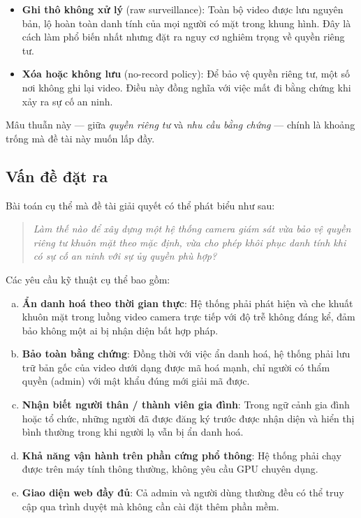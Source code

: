\begin{itemize}
    \item \textbf{Ghi thô không xử lý} (raw surveillance): Toàn bộ video được lưu nguyên bản, lộ hoàn toàn danh tính của mọi người có mặt trong khung hình. Đây là cách làm phổ biến nhất nhưng đặt ra nguy cơ nghiêm trọng về quyền riêng tư.
    \item \textbf{Xóa hoặc không lưu} (no-record policy): Để bảo vệ quyền riêng tư, một số nơi không ghi lại video. Điều này đồng nghĩa với việc mất đi bằng chứng khi xảy ra sự cố an ninh.
\end{itemize}

\medskip
Mâu thuẫn này --- giữa \textit{quyền riêng tư} và \textit{nhu cầu bằng chứng} --- chính là khoảng trống mà đề tài này muốn lấp đầy.

\subsection{Vấn đề đặt ra}
\label{subsec:vandede}

Bài toán cụ thể mà đề tài giải quyết có thể phát biểu như sau:

\begin{quote}
\textit{Làm thế nào để xây dựng một hệ thống camera giám sát vừa bảo vệ quyền riêng tư khuôn mặt theo mặc định, vừa cho phép khôi phục danh tính khi có sự cố an ninh với sự ủy quyền phù hợp?}
\end{quote}

\medskip
Các yêu cầu kỹ thuật cụ thể bao gồm:

\begin{enumerate}[a)]
    \item \textbf{Ẩn danh hoá theo thời gian thực}: Hệ thống phải phát hiện và che khuất khuôn mặt trong luồng video camera trực tiếp với độ trễ không đáng kể, đảm bảo không một ai bị nhận diện bất hợp pháp.
    \item \textbf{Bảo toàn bằng chứng}: Đồng thời với việc ẩn danh hoá, hệ thống phải lưu trữ bản gốc của video dưới dạng được mã hoá mạnh, chỉ người có thẩm quyền (admin) với mật khẩu đúng mới giải mã được.
    \item \textbf{Nhận biết người thân / thành viên gia đình}: Trong ngữ cảnh gia đình hoặc tổ chức, những người đã được đăng ký trước được nhận diện và hiển thị bình thường trong khi người lạ vẫn bị ẩn danh hoá.
    \item \textbf{Khả năng vận hành trên phần cứng phổ thông}: Hệ thống phải chạy được trên máy tính thông thường, không yêu cầu GPU chuyên dụng.
    \item \textbf{Giao diện web đầy đủ}: Cả admin và người dùng thường đều có thể truy cập qua trình duyệt mà không cần cài đặt thêm phần mềm.
\end{enumerate}

